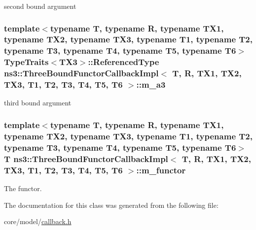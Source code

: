 second bound argument 

\subsubsection[{\texorpdfstring{m\+\_\+a3}{m_a3}}]{\setlength{\rightskip}{0pt plus 5cm}template$<$typename T, typename R, typename T\+X1, typename T\+X2, typename T\+X3, typename T1, typename T2, typename T3, typename T4, typename T5, typename T6$>$ {\bf Type\+Traits}$<$T\+X3$>$\+::Referenced\+Type {\bf ns3\+::\+Three\+Bound\+Functor\+Callback\+Impl}$<$ T, R, T\+X1, T\+X2, T\+X3, T1, T2, T3, T4, T5, T6 $>$\+::m\+\_\+a3\hspace{0.3cm}{\ttfamily [private]}}\hypertarget{classns3_1_1ThreeBoundFunctorCallbackImpl_a9f44c80b9158946d5d321e3e28e3dc5e}{}\label{classns3_1_1ThreeBoundFunctorCallbackImpl_a9f44c80b9158946d5d321e3e28e3dc5e}


third bound argument 

\subsubsection[{\texorpdfstring{m\+\_\+functor}{m_functor}}]{\setlength{\rightskip}{0pt plus 5cm}template$<$typename T, typename R, typename T\+X1, typename T\+X2, typename T\+X3, typename T1, typename T2, typename T3, typename T4, typename T5, typename T6$>$ T {\bf ns3\+::\+Three\+Bound\+Functor\+Callback\+Impl}$<$ T, R, T\+X1, T\+X2, T\+X3, T1, T2, T3, T4, T5, T6 $>$\+::m\+\_\+functor\hspace{0.3cm}{\ttfamily [private]}}\hypertarget{classns3_1_1ThreeBoundFunctorCallbackImpl_aba0b9eaf53ed5db5aa306e883cadf8e8}{}\label{classns3_1_1ThreeBoundFunctorCallbackImpl_aba0b9eaf53ed5db5aa306e883cadf8e8}


The functor. 



The documentation for this class was generated from the following file\+:\begin{DoxyCompactItemize}
\item 
core/model/\hyperlink{callback_8h}{callback.\+h}\end{DoxyCompactItemize}
